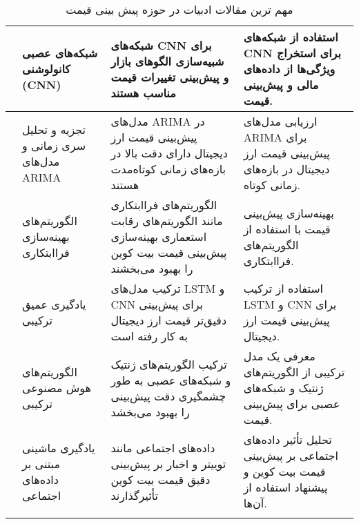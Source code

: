 \begin{longtable}{|c|p{1.5cm}|p{4cm}|p{3.5cm}|}
	\hline
	\cite{author10} & شبکه‌های عصبی کانولوشنی (CNN) & شبکه‌های CNN برای شبیه‌سازی الگوهای بازار و پیش‌بینی تغییرات قیمت مناسب هستند & استفاده از شبکه‌های CNN برای استخراج ویژگی‌ها از داده‌های مالی و پیش‌بینی قیمت. \\
	\hline
	\cite{author11} & تجزیه و تحلیل سری زمانی و مدل‌های ARIMA & مدل‌های ARIMA در پیش‌بینی قیمت ارز دیجیتال دارای دقت بالا در بازه‌های زمانی کوتاه‌مدت هستند & ارزیابی مدل‌های ARIMA برای پیش‌بینی قیمت ارز دیجیتال در بازه‌های زمانی کوتاه. \\
	\hline
	\cite{author12} & الگوریتم‌های بهینه‌سازی فراابتکاری & الگوریتم‌های فراابتکاری مانند الگوریتم‌های رقابت استعماری بهینه‌سازی پیش‌بینی قیمت بیت کوین را بهبود می‌بخشند & بهینه‌سازی پیش‌بینی قیمت با استفاده از الگوریتم‌های فراابتکاری. \\
	\hline
	\cite{author13} & یادگیری عمیق ترکیبی & ترکیب مدل‌های LSTM و CNN برای پیش‌بینی دقیق‌تر قیمت ارز دیجیتال به کار رفته است & استفاده از ترکیب LSTM و CNN برای پیش‌بینی قیمت ارز دیجیتال. \\
	\hline
	\cite{author14} & الگوریتم‌های هوش مصنوعی ترکیبی & ترکیب الگوریتم‌های ژنتیک و شبکه‌های عصبی به طور چشمگیری دقت پیش‌بینی را بهبود می‌بخشد & معرفی یک مدل ترکیبی از الگوریتم‌های ژنتیک و شبکه‌های عصبی برای پیش‌بینی قیمت. \\
	\hline
	\cite{author15} & یادگیری ماشینی مبتنی بر داده‌های اجتماعی & داده‌های اجتماعی مانند توییتر و اخبار بر پیش‌بینی دقیق قیمت بیت کوین تأثیرگذارند & تحلیل تأثیر داده‌های اجتماعی بر پیش‌بینی قیمت بیت کوین و پیشنهاد استفاده از آن‌ها. \\
	\hline
	\caption{مهم ترین مقالات ادبیات در حوزه پیش بینی قیمت}
\end{longtable}

